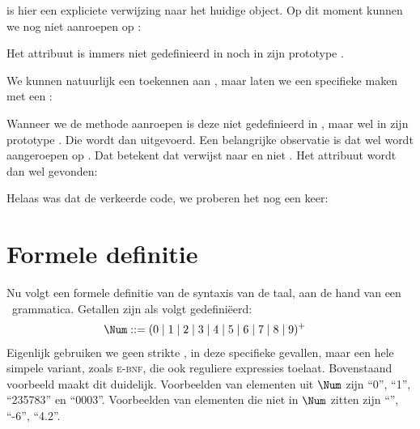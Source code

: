 
 is hier een expliciete verwijzing naar het huidige object. Op dit moment kunnen we  nog niet aanroepen op :


Het attribuut  is immers niet gedefinieerd in  noch in zijn prototype .

We kunnen natuurlijk een  toekennen aan , maar laten we een specifieke  maken met een :


Wanneer we de methode  aanroepen is deze niet gedefinieerd in , maar wel in zijn prototype . Die wordt dan uitgevoerd. Een belangrijke observatie is dat  wel wordt aangeroepen op . Dat betekent dat  verwijst naar  en niet . Het attribuut  wordt dan wel gevonden:


Helaas was dat de verkeerde code, we proberen het nog een keer:



\section{Formele definitie}

Nu volgt een formele definitie van de syntaxis van de taal, aan de hand van een \BNF\ grammatica. Getallen zijn als volgt gedefiniëerd:
%
\begin{align*}
  \Num \GrammarDef (0 \mid 1 \mid 2 \mid 3 \mid 4 \mid 5 \mid 6 \mid 7 \mid 8 \mid 9)^+
\end{align*}
%
Eigenlijk gebruiken we geen strikte \BNF, in deze specifieke gevallen, maar een hele simpele variant, zoals \textsc{e-bnf}, die ook reguliere expressies toelaat. Bovenstaand voorbeeld maakt dit duidelijk. Voorbeelden van elementen uit $\Num$ zijn ``0'', ``1'', ``235783'' en ``0003''. Voorbeelden van elementen die niet in $\Num$ zitten zijn ``'', ``-6'', ``4.2''.

